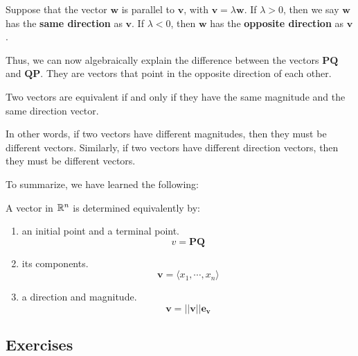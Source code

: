 \begin{definition}
Suppose that the vector $\bm{w}$ is parallel to $\bm{v}$, with $\bm{v} = \lambda \bm{w}$.  If $\lambda > 0$, then we say $\bm{w}$ has the \textbf{same direction} as $\bm{v}$.  If $\lambda < 0$, then $\bm{w}$ has the \textbf{opposite direction} as $\bm{v}$.
\end{definition}

Thus, we can now algebraically explain the difference between the vectors $\bm{PQ}$ and $\bm{QP}$. They are vectors that point in the opposite direction of each other.

\begin{proposition}
    Two vectors are equivalent if and only if they have the same magnitude and the same direction vector.
\end{proposition}


In other words, if two vectors have different magnitudes, then they must be different vectors.  Similarly, if two vectors have different direction vectors, then they must be different vectors.

To summarize, we have learned the following:

    \begin{example}
    
    A vector in $\mathbb{R}^n$ is determined equivalently by:
    
    \begin{enumerate}
        \item an initial point and a terminal point. $$v = \bm{PQ}$$
        \item its components. $$\bm{v} = \langle x_1, \cdots, x_n \rangle$$
        \item a direction and magnitude. $$\bm{v} = ||\bm{v}||\bm{e_v}$$
    \end{enumerate}
    \end{example}
















\subsection{Exercises}

